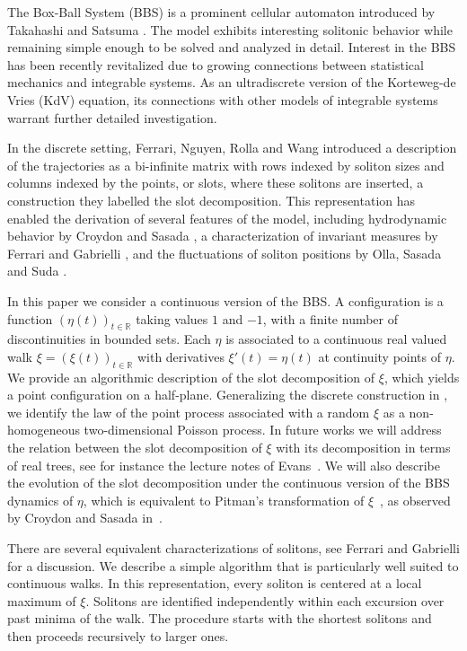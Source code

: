 \documentclass[12pt]{article}
\numberwithin{equation}{section}
\newcommand{\RR}{\mathbb R}
\begin{document}
The Box-Ball System (BBS) is a prominent cellular automaton introduced by Takahashi and Satsuma \cite{TS90}. The model exhibits interesting solitonic behavior while remaining simple enough to be solved and analyzed in detail. Interest in the BBS has been recently revitalized due to growing connections between statistical mechanics and integrable systems. As an ultradiscrete version of the Korteweg-de Vries (KdV) equation, its connections with other models of integrable systems warrant further detailed investigation.

In the discrete setting, Ferrari, Nguyen, Rolla and Wang \cite{FNRW} introduced a description of the trajectories as a bi-infinite matrix with rows indexed by soliton sizes and columns indexed by the points, or slots,  where these solitons are inserted, a construction they labelled the slot decomposition. This representation has enabled the derivation of several features of the model, including hydrodynamic behavior by Croydon and Sasada \cite{CroydonSasada20}, a characterization of invariant measures by Ferrari and Gabrielli \cite{FG19}, and the fluctuations of soliton positions by Olla, Sasada and Suda \cite{olla2025scalinglimitssolitonsboxball}.

In this paper we consider a continuous version of the BBS. A configuration is a function $(\eta(t))_{t\in\RR}$ taking values $1$ and $-1$, with a finite number of discontinuities in bounded sets. Each $\eta$ is associated to a continuous real valued walk $\xi=(\xi(t))_{t\in\RR}$ with derivatives $\xi'(t)=\eta(t)$ at continuity points of $\eta$. We provide an algorithmic description of the slot decomposition of $\xi$, which yields a point configuration on a half-plane. Generalizing the discrete construction in \cite{FG19}, we identify the law of the point process associated with a random $\xi$ as a non-homogeneous two-dimensional Poisson process.
In future works we will address the relation between the slot decomposition of $\xi$ with its decomposition in terms of real trees, see for instance the lecture notes of Evans~\cite{evans}. We will also describe the evolution of the slot decomposition under the continuous version of the BBS dynamics of $\eta$, which is equivalent to Pitman's transformation of $\xi$~\cite{PitmanBM-Bessel}, as observed by Croydon and Sasada in~\cite{zbMATH07500585}.

There are several equivalent characterizations of solitons, see Ferrari and Gabrielli \cite{FG18} for a discussion. We describe a simple algorithm that is particularly well suited to continuous walks. In this representation, every soliton is centered at a local maximum of $\xi$. Solitons are identified independently within each excursion over past minima of the walk. The procedure starts with the shortest solitons and then proceeds recursively to larger ones.
\end{document}
